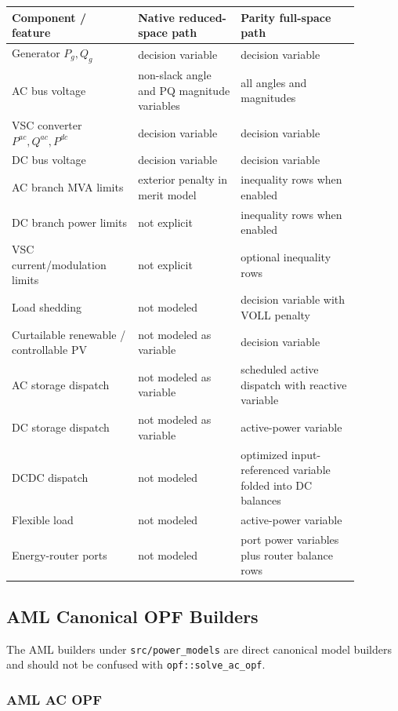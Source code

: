 \begin{longtable}{L{0.32\linewidth}L{0.26\linewidth}L{0.30\linewidth}}
\toprule
Component / feature & Native reduced-space path & Parity full-space path \\
\midrule
\endhead
Generator \(P_g,Q_g\) & decision variable & decision variable \\
AC bus voltage & non-slack angle and PQ magnitude variables & all angles and magnitudes \\
VSC converter \(P^{ac},Q^{ac},P^{dc}\) & decision variable & decision variable \\
DC bus voltage & decision variable & decision variable \\
AC branch MVA limits & exterior penalty in merit model & inequality rows when enabled \\
DC branch power limits & not explicit & inequality rows when enabled \\
VSC current/modulation limits & not explicit & optional inequality rows \\
Load shedding & not modeled & decision variable with VOLL penalty \\
Curtailable renewable / controllable PV & not modeled as variable & decision variable \\
AC storage dispatch & not modeled as variable & scheduled active dispatch with reactive variable \\
DC storage dispatch & not modeled as variable & active-power variable \\
DCDC dispatch & not modeled & optimized input-referenced variable folded into DC balances \\
Flexible load & not modeled & active-power variable \\
Energy-router ports & not modeled & port power variables plus router balance rows \\
\bottomrule
\end{longtable}

\subsection{AML Canonical OPF Builders}

The AML builders under \texttt{src/power\_models} are direct canonical model
builders and should not be confused with \texttt{opf::solve\_ac\_opf}.

\subsubsection{AML AC OPF}

